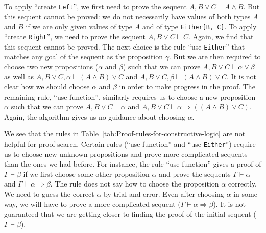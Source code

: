 To apply \textsf{``}create \lstinline!Left!\textsf{''}, we first need to prove the
sequent $A,B\vee C\vdash A\wedge B$. But this sequent cannot be proved:
we do not necessarily have values of both types $A$ and $B$ if we
are only given values of type $A$ and of type \lstinline!Either[B, C]!.
To apply \textsf{``}create \lstinline!Right!\textsf{''}, we need to prove the sequent
$A,B\vee C\vdash C$. Again, we find that this sequent cannot be proved.
The next choice is the rule \textsf{``}use \lstinline!Either!\textsf{''} that matches
any goal of the sequent as the proposition $\gamma$. But we are then
required to choose two new propositions ($\alpha$ and $\beta$) such
that we can prove $A,B\vee C\vdash\alpha\vee\beta$ as well as $A,B\vee C,\alpha\vdash(A\wedge B)\vee C$
and $A,B\vee C,\beta\vdash(A\wedge B)\vee C$. It is not clear how
we should choose $\alpha$ and $\beta$ in order to make progress
in the proof. The remaining rule, \textsf{``}use function\textsf{''}, similarly requires
us to choose a new proposition $\alpha$ such that we can prove $A,B\vee C\vdash\alpha$
and $A,B\vee C\vdash\alpha\Rightarrow((A\wedge B)\vee C)$. Again,
the algorithm gives us no guidance about choosing $\alpha$.

We see that the rules in Table~\ref{tab:Proof-rules-for-constructive-logic}
are not helpful for proof search. Certain rules (\textsf{``}use function\textsf{''}
and \textsf{``}use \lstinline!Either!\textsf{''}) require us to choose new unknown
propositions and prove more complicated sequents than the ones we
had before. For instance, the rule \textsf{``}use function\textsf{''} gives a proof
of $\Gamma\vdash\beta$ if we first choose some other proposition
$\alpha$ and prove the sequents $\Gamma\vdash\alpha$ and $\Gamma\vdash\alpha\Rightarrow\beta$.
The rule does not say how to choose the proposition $\alpha$ correctly.
We need to guess the correct $\alpha$ by trial and error. Even after
choosing $\alpha$ in some way, we will have to prove a more complicated
sequent ($\Gamma\vdash\alpha\Rightarrow\beta$). It is not guaranteed
that we are getting closer to finding the proof of the initial sequent
($\Gamma\vdash\beta$). 

